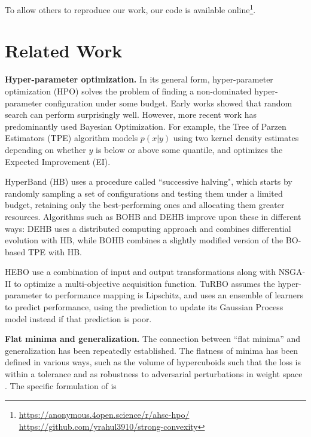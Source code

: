 \documentclass[preprint,12pt]{elsarticle}
\begin{document}
To allow others to reproduce our work, our code is available online\footnote{
\ifanon
\url{https://anonymous.4open.science/r/ahsc-hpo/}
\else 
\url{https://github.com/yrahul3910/strong-convexity}
\fi
}.

\section{Related Work}


\textbf{Hyper-parameter optimization.} In its general form, hyper-parameter optimization (HPO) solves the problem of finding a non-dominated hyper-parameter configuration under some budget. 
Early works \cite{bergstra2012random, bergstra2011algorithms} showed that random search can perform surprisingly well. However, more recent work has predominantly used Bayesian Optimization. For example, the Tree of Parzen Estimators (TPE) algorithm models $p(x|y)$ using two kernel density estimates depending on whether $y$ is below or above some quantile, and optimizes the Expected Improvement (EI). 

HyperBand (HB) \cite{li2017hyperband} uses a procedure called ``successive halving", which starts by randomly sampling a set of configurations and testing them under a limited budget, retaining only the best-performing ones and allocating them greater resources. Algorithms such as BOHB \cite{falkner2018bohb} and DEHB \cite{awad2021dehb} improve upon these in different ways: DEHB uses a distributed computing approach and combines differential evolution with HB, while BOHB combines a slightly modified version of the BO-based TPE with HB.

HEBO \cite{cowen2022hebo} use a combination of input and output transformations along with NSGA-II to optimize a multi-objective acquisition function. TuRBO \cite{dou2023turbo} assumes the hyper-parameter to performance mapping is Lipschitz, and uses an ensemble of learners to predict performance, using the prediction to update its Gaussian Process model instead if that prediction is poor.

\textbf{Flat minima and generalization.} The connection between ``flat minima'' and generalization has been repeatedly established. The flatness of minima has been defined in various ways, such as the volume of hypercuboids such that the loss is within a tolerance \cite{hochreiter1997flat} and as robustness to adversarial perturbations in weight space \cite{keskar2016large}. The specific formulation of \citet{keskar2016large} is
\end{document}
